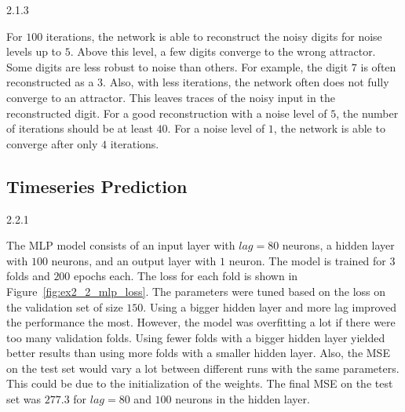 \begin{task}{2.1.3}
\end{task}

For $100$ iterations, the network is able to reconstruct the noisy digits for noise levels up to
$5$. Above this level, a few digits converge to the wrong attractor. Some digits are less robust to
noise than others. For example, the digit $7$ is often reconstructed as a $3$. Also, with less
iterations, the network often does not fully converge to an attractor. This leaves traces of the
noisy input in the reconstructed digit. For a good reconstruction with a noise level of $5$, the
number of iterations should be at least $40$. For a noise level of $1$, the network is able to
converge after only $4$ iterations.


\subsection{Timeseries Prediction}
\label{ex:2.2}


\begin{task}{2.2.1}
\end{task}

The MLP model consists of an input layer with $lag = 80$ neurons, a hidden layer with $100$ neurons,
and an output layer with $1$ neuron. The model is trained for $3$ folds and $200$ epochs each. The
loss for each fold is shown in Figure~\ref{fig:ex2_2_mlp_loss}. The parameters were tuned based on
the loss on the validation set of size $150$. Using a bigger hidden layer and more lag improved the
performance the most. However, the model was overfitting a lot if there were too many validation
folds. Using fewer folds with a bigger hidden layer yielded better results than using more folds
with a smaller hidden layer. Also, the MSE on the test set would vary a lot between different
runs with the same parameters. This could be due to the initialization of the weights. The final
MSE on the test set was $277.3$ for $lag = 80$ and $100$ neurons in the hidden layer.

